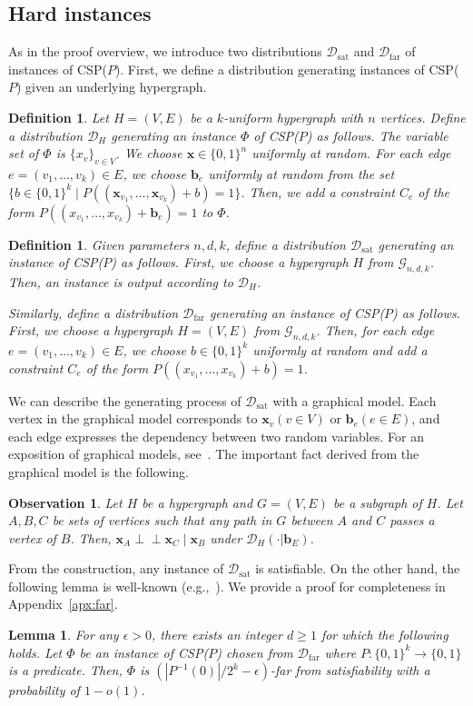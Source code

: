\documentclass[letterpaper,11pt]{article}
\newtheorem{lemma}[theorem]{Lemma}
\newtheorem{definition}[theorem]{Definition}
\newtheorem{observation}[theorem]{Observation}
\newcommand{\cald}{\mathcal{D}}
\newcommand{\caldsat}{\mathcal{D}_{\mathrm{sat}}}
\newcommand{\caldfar}{\mathcal{D}_{\mathrm{far}}}
\newcommand{\calg}{\mathcal{G}}
\newcommand{\bfx}{\mathbf{x}}
\newcommand{\bfb}{\mathbf{b}}
\newcommand{\ci}{\perp\!\!\!\perp}
\newcommand{\bit}{\{0,1\}}
\newcommand{\csp}[1]{\textsf{CSP}(#1)\xspace}
\begin{document}
\subsection{Hard instances}\label{subsec:hard-instance}
As in the proof overview, 
we introduce two distributions $\caldsat$ and $\caldfar$ of instances of \csp{$P$}.
First, we define a distribution generating instances of \csp{$P$} given an underlying hypergraph.
\begin{definition}
  Let $H=(V,E)$ be a $k$-uniform hypergraph with $n$ vertices.
  Define a distribution $\cald_H$ generating an instance $\Phi$ of \csp{$P$} as follows.
  The variable set of $\Phi$ is $\{x_v\}_{v\in V}$.
  We choose $\bfx\in \bit^n$ uniformly at random.
  For each edge $e=(v_1,\ldots,v_k)\in E$, 
  we choose $\bfb_e$ uniformly at random from the set $\{b\in \bit^k\mid P((\bfx_{v_1},\ldots,\bfx_{v_k})+b)=1 \}$.
  Then, we add a constraint $C_e$ of the form $P((x_{v_1},\ldots,x_{v_k})+\bfb_e)=1$ to $\Phi$.
\end{definition}
\begin{definition}
  Given parameters $n,d,k$, 
  define a distribution $\caldsat$ generating an instance of \csp{$P$} as follows.
  First, we choose a hypergraph $H$ from $\calg_{n,d,k}$.
  Then, an instance is output according to $\cald_H$.

  Similarly, define a distribution $\caldfar$ generating an instance of \csp{$P$} as follows.
  First, we choose a hypergraph $H=(V,E)$ from $\calg_{n,d,k}$.
  Then, for each edge $e=(v_1,\ldots,v_k)\in E$,
  we choose $b\in \bit^k$ uniformly at random and add a constraint $C_e$ of the form $P((x_{v_1},\ldots,x_{v_k})+b)=1$.
\end{definition}
We can describe the generating process of $\caldsat$ with a graphical model.
Each vertex in the graphical model corresponds to $\bfx_v (v\in V)$ or $\bfb_e (e\in E)$,
and each edge expresses the dependency between two random variables.
For an exposition of graphical models, see~\cite{Bis06}.
The important fact derived from the graphical model is the following.
\begin{observation}
  Let $H$ be a hypergraph and $G=(V,E)$ be a subgraph of $H$.
  Let $A,B,C$ be sets of vertices such that any path in $G$ between $A$ and $C$ passes a vertex of $B$.
  Then, $\bfx_A\ci \bfx_C \mid \bfx_B$ under $\cald_H(\cdot|\bfb_E)$.
\end{observation}

From the construction, 
any instance of $\caldsat$ is satisfiable.
On the other hand, 
the following lemma is well-known (e.g.,~\cite{Sch08,Tul09}).
We provide a proof for completeness in Appendix~\ref{apx:far}.
\begin{lemma}\label{lmm:far}
  For any $\epsilon>0$, there exists an integer $d\geq 1$ for which the following holds.
  Let $\Phi$ be an instance of \csp{$P$} chosen from $\caldfar$ where $P:\bit^k\to\bit$ is a predicate.
  Then, $\Phi$ is $(|P^{-1}(0)|/2^k-\epsilon)$-far from satisfiability with a probability of $1-o(1)$.
\end{lemma}
\end{document}
